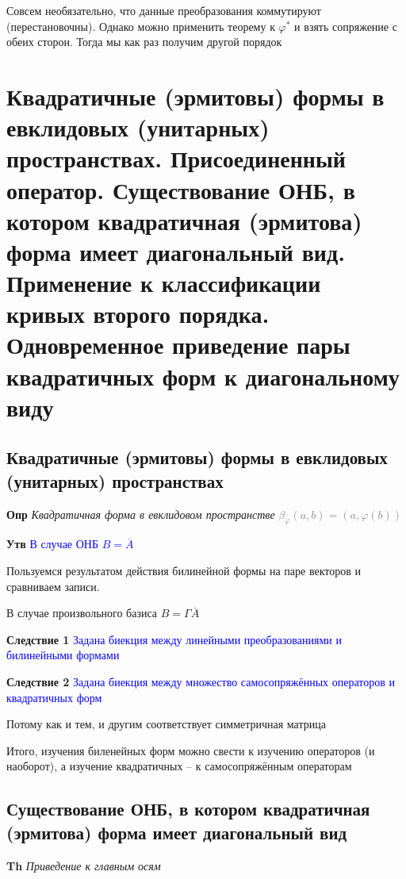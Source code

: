 \documentclass[a4paper, 14pt]{article}
\begin{document}
    Совсем необязательно, что данные преобразования коммутируют (перестановочны).
    Однако можно применить теорему к $\varphi^*$ и взять сопряжение с обеих сторон.
    Тогда мы как раз получим другой порядок
    
    \section{Квадратичные (эрмитовы) формы в евклидовых (унитарных) пространствах.
    Присоединенный оператор.
    Существование ОНБ, в котором квадратичная (эрмитова) форма имеет диагональный вид.
    Применение к классификации кривых второго порядка.
    Одновременное приведение пары квадратичных форм к диагональному виду}
    
    \subsection{Квадратичные (эрмитовы) формы в евклидовых (унитарных) пространствах}
    
    \textbf{Опр} \textit{Квадратичная форма в евклидовом пространстве} \textcolor{gray}{$\beta_\varphi (a, b) = (a, \varphi(b))$}
    
    \textbf{Утв} \textcolor{blue}{В случае ОНБ $B = \overline{A}$}
    
    Пользуемся результатом действия билинейной формы на паре векторов и сравниваем записи.
    
    В случае произвольного базиса $B = \Gamma \overline{A}$
    
    \textbf{Следствие 1} \textcolor{blue}{Задана биекция между линейными преобразованиями и билинейными формами}
    
    \textbf{Следствие 2} \textcolor{blue}{Задана биекция между множество самосопряжённых операторов и квадратичных форм}
    
    Потому как и тем, и другим соответствует симметричная матрица
    
    Итого, изучения биленейных форм можно свести к изучению операторов (и наоборот), а изучение квадратичных -- к
    самосопряжённым операторам
    
    \subsection{Существование ОНБ, в котором квадратичная (эрмитова) форма имеет диагональный вид}
    
    \textbf{Th} \textit{Приведение к главным осям}
    
\end{document}
